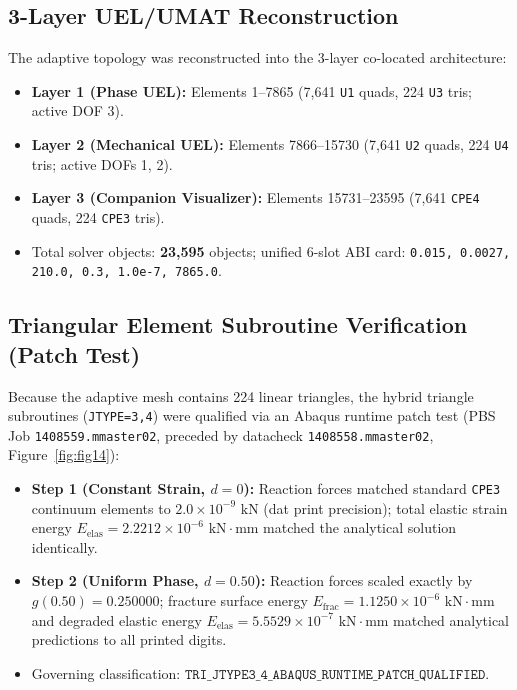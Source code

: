 \documentclass[11pt,a4paper]{article}
\begin{document}
\subsection{3-Layer UEL/UMAT Reconstruction}
The adaptive topology was reconstructed into the 3-layer co-located architecture:
\begin{itemize}[leftmargin=*]
    \item \textbf{Layer 1 (Phase UEL):} Elements 1--7865 (7,641 \texttt{U1} quads, 224 \texttt{U3} tris; active DOF 3).
    \item \textbf{Layer 2 (Mechanical UEL):} Elements 7866--15730 (7,641 \texttt{U2} quads, 224 \texttt{U4} tris; active DOFs 1, 2).
    \item \textbf{Layer 3 (Companion Visualizer):} Elements 15731--23595 (7,641 \texttt{CPE4} quads, 224 \texttt{CPE3} tris).
    \item Total solver objects: \textbf{23,595} objects; unified 6-slot ABI card: \texttt{0.015, 0.0027, 210.0, 0.3, 1.0e-7, 7865.0}.
\end{itemize}

\subsection{Triangular Element Subroutine Verification (Patch Test)}
Because the adaptive mesh contains 224 linear triangles, the hybrid triangle subroutines (\texttt{JTYPE=3,4}) were qualified via an Abaqus runtime patch test (PBS Job \texttt{1408559.mmaster02}, preceded by datacheck \texttt{1408558.mmaster02}, Figure~\ref{fig:fig14}):
\begin{itemize}[leftmargin=*]
    \item \textbf{Step 1 (Constant Strain, $d=0$):} Reaction forces matched standard \texttt{CPE3} continuum elements to $2.0\times 10^{-9}\text{ kN}$ (dat print precision); total elastic strain energy $E_{\mathrm{elas}} = 2.2212\times 10^{-6}\text{ kN}\cdot\text{mm}$ matched the analytical solution identically.
    \item \textbf{Step 2 (Uniform Phase, $d=0.50$):} Reaction forces scaled exactly by $g(0.50) = 0.250000$; fracture surface energy $E_{\mathrm{frac}} = 1.1250\times 10^{-6}\text{ kN}\cdot\text{mm}$ and degraded elastic energy $E_{\mathrm{elas}} = 5.5529\times 10^{-7}\text{ kN}\cdot\text{mm}$ matched analytical predictions to all printed digits.
    \item Governing classification: $\mathtt{TRI\_JTYPE3\_4\_ABAQUS\_RUNTIME\_PATCH\_QUALIFIED}$.
\end{itemize}
\end{document}
